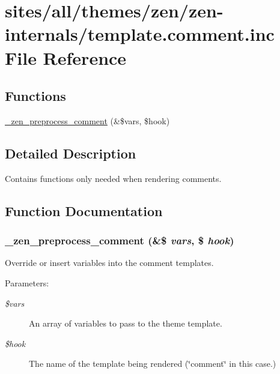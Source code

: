 \hypertarget{template_8comment_8inc}{
\section{sites/all/themes/zen/zen-internals/template.comment.inc File Reference}
\label{template_8comment_8inc}
}
\subsection*{Functions}
\begin{CompactItemize}
\item 
\hyperlink{template_8comment_8inc_0ab192221c76c61b16c4b54bc964f0da}{\_\-zen\_\-preprocess\_\-comment} (\&\$vars, \$hook)
\end{CompactItemize}


\subsection{Detailed Description}
Contains functions only needed when rendering comments. 

\subsection{Function Documentation}
\hypertarget{template_8comment_8inc_0ab192221c76c61b16c4b54bc964f0da}{
\subsubsection[{\_\-zen\_\-preprocess\_\-comment}]{\setlength{\rightskip}{0pt plus 5cm}\_\-zen\_\-preprocess\_\-comment (\&\$ {\em vars}, \/  \$ {\em hook})}}
\label{template_8comment_8inc_0ab192221c76c61b16c4b54bc964f0da}


Override or insert variables into the comment templates.

\begin{Desc}
\item[Parameters:]
\begin{description}
\item[{\em \$vars}]An array of variables to pass to the theme template. \item[{\em \$hook}]The name of the template being rendered (\char`\"{}comment\char`\"{} in this case.) \end{description}
\end{Desc}
